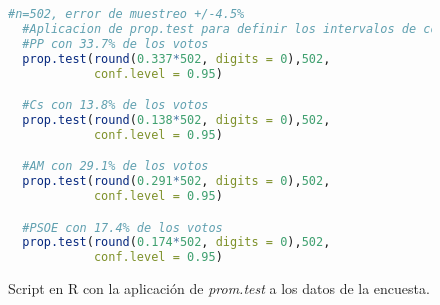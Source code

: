 \documentclass[11pt,a4paper]{article}
\begin{document}
\begin{figure}
\centering
\begin{lstlisting}[language=R]
  #n=502, error de muestreo +/-4.5%
  #Aplicacion de prop.test para definir los intervalos de confianza
  #PP con 33.7% de los votos
  prop.test(round(0.337*502, digits = 0),502,
            conf.level = 0.95)

  #Cs con 13.8% de los votos
  prop.test(round(0.138*502, digits = 0),502,
            conf.level = 0.95)

  #AM con 29.1% de los votos
  prop.test(round(0.291*502, digits = 0),502,
            conf.level = 0.95)

  #PSOE con 17.4% de los votos
  prop.test(round(0.174*502, digits = 0),502,
            conf.level = 0.95)
\end{lstlisting}
\caption{Script en R con la aplicación de \textit{prom.test} a los datos de la encuesta.}
\label{fig:promtest}
\end{figure}
\end{document}
